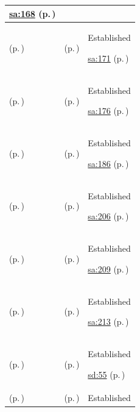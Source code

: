 \begin{longtable}{|>{\raggedright\arraybackslash}p{0.27\TableWidth}|>{\raggedright\arraybackslash}p{0.27\TableWidth}|>{\raggedright\arraybackslash}p{0.46\TableWidth}|}
 \hyperref[rad:sa:163]{sa:168} (p.\,\pageref{rad:sa:163})\\\hline
\nameref{function:govern-clinical-document-lifecycle} (p.\,\pageref{function:govern-clinical-document-lifecycle}) & \nameref{feature:feat-sa-24} (p.\,\pageref{feature:feat-sa-24}) & Established

 \hyperref[rad:sa:163]{sa:171} (p.\,\pageref{rad:sa:163})\\\hline
\nameref{function:index-clinical-document-metadata} (p.\,\pageref{function:index-clinical-document-metadata}) & \nameref{feature:feat-sa-25} (p.\,\pageref{feature:feat-sa-25}) & Established

 \hyperref[rad:sa:163]{sa:176} (p.\,\pageref{rad:sa:163})\\\hline
\nameref{function:receive-care-plan} (p.\,\pageref{function:receive-care-plan}) & \nameref{feature:feat-sa-26} (p.\,\pageref{feature:feat-sa-26}) & Established

 \hyperref[rad:sa:183]{sa:186} (p.\,\pageref{rad:sa:183})\\\hline
\nameref{function:distribute-clinical-communication} (p.\,\pageref{function:distribute-clinical-communication}) & \nameref{feature:feat-sa-27} (p.\,\pageref{feature:feat-sa-27}) & Established

 \hyperref[rad:sa:199]{sa:206} (p.\,\pageref{rad:sa:199})\\\hline
\nameref{function:track-business-delivery-acknowledgement} (p.\,\pageref{function:track-business-delivery-acknowledgement}) & \nameref{feature:feat-sa-28} (p.\,\pageref{feature:feat-sa-28}) & Established

 \hyperref[rad:sa:199]{sa:209} (p.\,\pageref{rad:sa:199})\\\hline
\nameref{function:record-communication-transaction} (p.\,\pageref{function:record-communication-transaction}) & \nameref{feature:feat-sa-29} (p.\,\pageref{feature:feat-sa-29}) & Established

 \hyperref[rad:sa:199]{sa:213} (p.\,\pageref{rad:sa:199})\\\hline
\nameref{function:correlate-primary-care-consultation-context} (p.\,\pageref{function:correlate-primary-care-consultation-context}) & \nameref{feature:feat-sd-01} (p.\,\pageref{feature:feat-sd-01}) & Established

 \hyperref[rad:sd:51]{sd:55} (p.\,\pageref{rad:sd:51})\\\hline
\nameref{function:assemble-acute-clinical-baseline} (p.\,\pageref{function:assemble-acute-clinical-baseline}) & \nameref{feature:feat-sd-04} (p.\,\pageref{feature:feat-sd-04}) & Established


\end{longtable}

